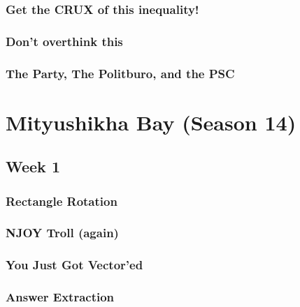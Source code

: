 \documentclass[titlepage=true]{scrartcl}
\begin{document}
    \subsubsection{Get the CRUX of this inequality!}
	\label{13.2.5}
	
	\newpage

    \subsubsection{Don't overthink this}
	\label{13.2.6}
	
	\newpage

    \subsubsection{The Party, The Politburo, and the PSC}
	\label{13.2.7}
	
	\newpage

\section{Mityushikha Bay (Season 14)}

    \subsection{Week 1}

    \subsubsection{Rectangle Rotation}
	\label{14.1.1}
	
	\newpage

	\subsubsection{NJOY Troll (again)}
	\label{14.1.2}
	
	\newpage

	\subsubsection{You Just Got Vector'ed}
	\label{14.1.3}
	
	\newpage

	\subsubsection{Answer Extraction}
	\label{14.1.4}
	
	\newpage
\end{document}
